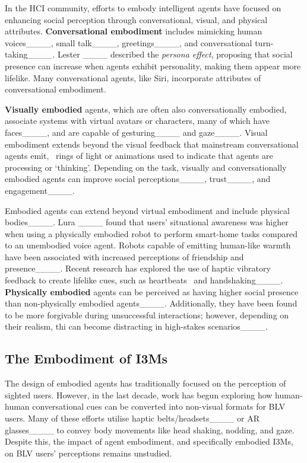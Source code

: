 In the HCI community, efforts to embody intelligent agents have focused on enhancing social perception through conversational, visual, and physical attributes. \textbf{Conversational embodiment} includes mimicking human voices____, small talk____, greetings____, and conversational turn-taking____. Lester \etal____ described the \textit{persona effect}, proposing that social presence can increase when agents exhibit personality, making them appear more lifelike. Many conversational agents, like Siri, incorporate attributes of conversational embodiment.

\textbf{Visually embodied} agents, which are often also conversationally embodied, associate systems with virtual avatars or characters, many of which have faces____, and are capable of gesturing____ and gaze____. Visual embodiment  extends beyond the visual feedback that mainstream conversational agents emit, \eg\ rings of light or animations used to indicate that agents are processing or `thinking'. Depending on the task, visually and conversationally embodied agents can improve social perceptions____, trust____, and engagement____. 

Embodied agents can extend beyond virtual embodiment and include physical bodies____. Lura \etal____ found that users' situational awareness was higher when using a physically embodied robot to perform smart-home tasks compared to an unembodied voice agent. Robots capable of emitting human-like warmth have been associated with increased perceptions of friendship and presence____. Recent research has explored the use of haptic vibratory feedback to create lifelike cues, such as heartbeats~\cite {Borgstedt2023} and handshaking____. \textbf{Physically embodied} agents can be perceived as having higher social presence than non-physically embodied agents____. Additionally, they have been found to be more forgivable during unsuccessful interactions; however, depending on their realism, thi can become distracting in high-stakes scenarios____.

\subsection{The Embodiment of I3Ms}
The design of embodied agents has traditionally focused on the perception of sighted users. However, in the last decade, work has begun exploring how human-human conversational cues can be converted into non-visual formats for BLV users. Many of these efforts utilise haptic belts/headsets____ or AR glasses____ to convey body movements like head shaking, nodding, and gaze. Despite this, the impact of agent embodiment, and specifically embodied I3Ms, on BLV users' perceptions remains unstudied.

